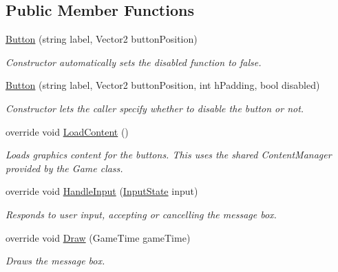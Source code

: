 \subsection*{Public Member Functions}
\begin{DoxyCompactItemize}
\item 
\hyperlink{classCityMania_1_1Button_a7f87e6ba947642e4eb464f2175e425ad}{Button} (string label, Vector2 buttonPosition)
\begin{DoxyCompactList}\small\item\em Constructor automatically sets the disabled function to false. \item\end{DoxyCompactList}\item 
\hyperlink{classCityMania_1_1Button_a9e15249818478f7500f4620ac81149e9}{Button} (string label, Vector2 buttonPosition, int hPadding, bool disabled)
\begin{DoxyCompactList}\small\item\em Constructor lets the caller specify whether to disable the button or not. \item\end{DoxyCompactList}\item 
override void \hyperlink{classCityMania_1_1Button_a6b056904b50808d69f7699dcde88415d}{LoadContent} ()
\begin{DoxyCompactList}\small\item\em Loads graphics content for the buttons. This uses the shared ContentManager provided by the Game class. \item\end{DoxyCompactList}\item 
override void \hyperlink{classCityMania_1_1Button_a7ffb254c3a65d1357d6f3c6dee74c4ab}{HandleInput} (\hyperlink{classCityMania_1_1InputState}{InputState} input)
\begin{DoxyCompactList}\small\item\em Responds to user input, accepting or cancelling the message box. \item\end{DoxyCompactList}\item 
override void \hyperlink{classCityMania_1_1Button_a48ed467fa9522c528d4369dc27fd1418}{Draw} (GameTime gameTime)
\begin{DoxyCompactList}\small\item\em Draws the message box. \item\end{DoxyCompactList}\end{DoxyCompactItemize}
